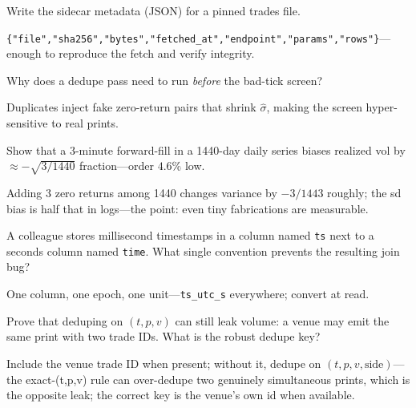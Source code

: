 \begin{exercise}
Write the sidecar metadata (JSON) for a pinned trades file.
\end{exercise}
\begin{solution}
\verb|{"file","sha256","bytes","fetched_at","endpoint","params","rows"}|---enough to
reproduce the fetch and verify integrity.
\end{solution}

\begin{exercise}
Why does a dedupe pass need to run \emph{before} the bad-tick screen?
\end{exercise}
\begin{solution}
Duplicates inject fake zero-return pairs that shrink $\hat\sigma$, making the screen
hyper-sensitive to real prints.
\end{solution}

\begin{exercise}
Show that a 3-minute forward-fill in a 1440-day daily series biases realized vol by
$\approx-\sqrt{3/1440}$ fraction---order $4.6\%$ low.
\end{exercise}
\begin{solution}
Adding 3 zero returns among 1440 changes variance by $-3/1443$ roughly; the sd bias is half
that in logs---the point: even tiny fabrications are measurable.
\end{solution}

\begin{exercise}
A colleague stores millisecond timestamps in a column named \texttt{ts} next to a seconds
column named \texttt{time}. What single convention prevents the resulting join bug?
\end{exercise}
\begin{solution}
One column, one epoch, one unit---\texttt{ts\_utc\_s} everywhere; convert at read.
\end{solution}

\begin{exercise}[hard]
Prove that deduping on $(t,p,v)$ can still leak volume: a venue may emit the same print with
two trade IDs. What is the robust dedupe key?
\end{exercise}
\begin{solution}
Include the venue trade ID when present; without it, dedupe on $(t,p,v,\text{side})$---the
exact-(t,p,v) rule can over-dedupe two genuinely simultaneous prints, which is the opposite
leak; the correct key is the venue's own id when available.
\end{solution}

